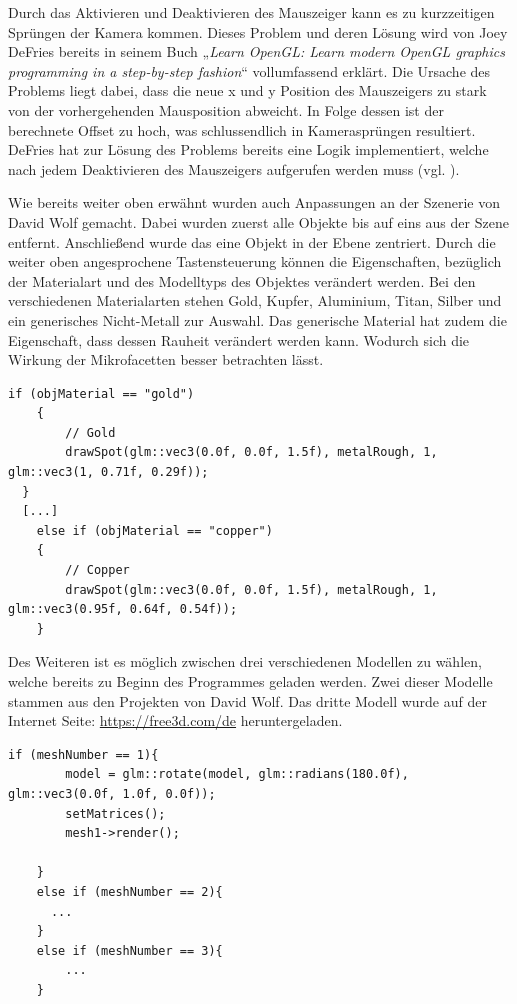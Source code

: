 \documentclass[
  11pt,
  a4paper,
  oneside
  ]{article}
\begin{document}
Durch das Aktivieren und Deaktivieren des Mauszeiger kann es zu kurzzeitigen Sprüngen der Kamera kommen. Dieses Problem und deren Lösung wird von Joey DeFries bereits in seinem Buch „\textit{Learn OpenGL: Learn modern OpenGL graphics programming in a step-by-step fashion}“ \cite{learnOpenGL} vollumfassend erklärt. Die Ursache des Problems liegt dabei, dass die neue x und y Position des Mauszeigers zu stark von der vorhergehenden Mausposition abweicht. In Folge dessen ist der berechnete Offset zu hoch, was schlussendlich in Kamerasprüngen resultiert. DeFries hat zur Lösung des Problems bereits eine Logik implementiert, welche nach jedem Deaktivieren des Mauszeigers aufgerufen werden muss (vgl. \cite{defriesKamera}).

Wie bereits weiter oben erwähnt wurden auch Anpassungen an der Szenerie von David Wolf gemacht. Dabei wurden zuerst alle Objekte bis auf eins aus der Szene entfernt. Anschließend wurde das eine Objekt in der Ebene zentriert. Durch die weiter oben angesprochene Tastensteuerung können die Eigenschaften, bezüglich der Materialart und des Modelltyps des Objektes verändert werden. Bei den verschiedenen Materialarten stehen Gold, Kupfer, Aluminium, Titan, Silber und ein generisches Nicht-Metall zur Auswahl. Das generische Material hat zudem die Eigenschaft, dass dessen Rauheit verändert werden kann. Wodurch sich die Wirkung der Mikrofacetten besser betrachten lässt. 
\begin{lstlisting}[tabsize=2, caption={If-Abfrage zur Entscheidung des Objekt-Materials}]
  if (objMaterial == "gold")
	{
		// Gold
		drawSpot(glm::vec3(0.0f, 0.0f, 1.5f), metalRough, 1, glm::vec3(1, 0.71f, 0.29f));
  }
  [...]  
	else if (objMaterial == "copper")
	{
		// Copper
		drawSpot(glm::vec3(0.0f, 0.0f, 1.5f), metalRough, 1, glm::vec3(0.95f, 0.64f, 0.54f));
	}
\end{lstlisting}

Des Weiteren ist es möglich zwischen drei verschiedenen Modellen zu wählen, welche bereits zu Beginn des Programmes geladen werden. Zwei dieser Modelle stammen aus den Projekten von David Wolf. Das dritte Modell wurde auf der Internet Seite: \url{https://free3d.com/de} heruntergeladen. 
\begin{lstlisting}[tabsize=2, caption={If-Abfrage zur Entscheidung des Objekt-Modells}]
  if (meshNumber == 1){
		model = glm::rotate(model, glm::radians(180.0f), glm::vec3(0.0f, 1.0f, 0.0f));
		setMatrices();
		mesh1->render();

	}
	else if (meshNumber == 2){
	  ...
	}
	else if (meshNumber == 3){
		...
	}
\end{lstlisting}
\end{document}
